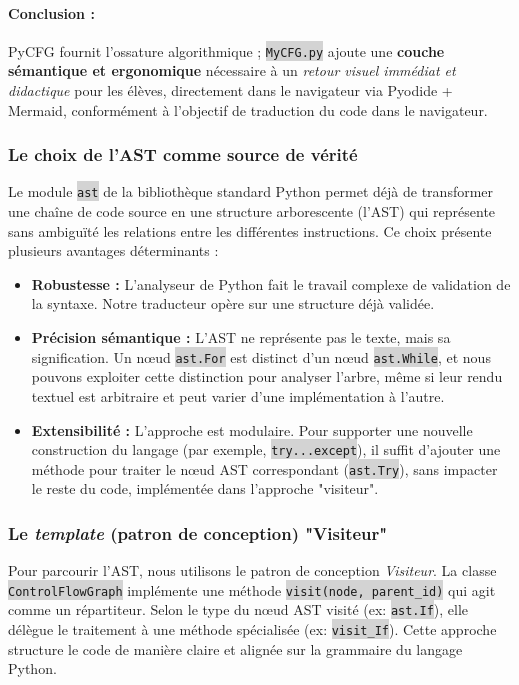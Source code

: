 \documentclass[11pt,a4paper]{article}
\newcommand{\code}[1]{\colorbox{lightgray}{\texttt{\small #1}}}
\begin{document}
\paragraph{Conclusion :} PyCFG fournit l’ossature algorithmique ; \code{MyCFG.py} ajoute une \textbf{couche sémantique
 et ergonomique} nécessaire à un \textit{retour visuel immédiat et didactique} pour les élèves, directement dans 
 le navigateur via Pyodide + Mermaid, conformément à l'objectif de traduction du code dans le navigateur.

 
\subsubsection{Le choix de l'AST comme source de vérité}
Le module \code{ast} de la bibliothèque standard Python permet déjà de transformer une chaîne de code source en une 
structure arborescente (l'AST) qui représente sans ambiguïté les relations entre les différentes instructions. 
Ce choix présente plusieurs avantages déterminants :
\begin{itemize}
    \item \textbf{Robustesse :} L'analyseur de Python fait le travail complexe de validation de la syntaxe. Notre traducteur opère sur une structure déjà validée.
    \item \textbf{Précision sémantique :} L'AST ne représente pas le texte, mais sa signification. Un nœud \code{ast.For} est distinct d'un nœud \code{ast.While}, et nous pouvons exploiter cette distinction pour analyser l'arbre, même si leur rendu textuel est arbitraire et peut varier d'une implémentation à l'autre.  
    \item \textbf{Extensibilité :} L'approche est modulaire. Pour supporter une nouvelle construction du langage (par exemple, \code{try...except}), il suffit d'ajouter une méthode pour traiter le nœud AST correspondant (\code{ast.Try}), sans impacter le reste du code, implémentée dans l'approche "visiteur".
\end{itemize}

\subsubsection{Le \textit{template} (patron de conception) "Visiteur"}
Pour parcourir l'AST, nous utilisons le patron de conception \textit{Visiteur}. La classe \code{ControlFlowGraph} implémente une méthode \code{visit(node, parent\_id)} qui agit comme un répartiteur. Selon le type du nœud AST visité (ex: \code{ast.If}), elle délègue le traitement à une méthode spécialisée (ex: \code{visit\_If}). Cette approche structure le code de manière claire et alignée sur la grammaire du langage Python.
\end{document}
